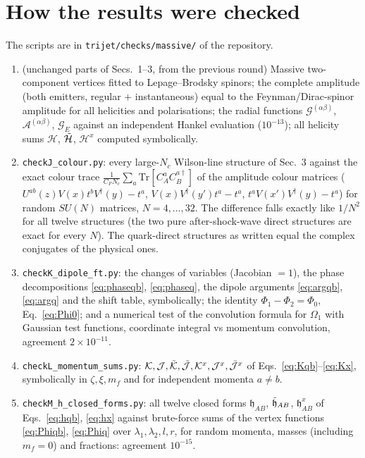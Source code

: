 \documentclass[9pt]{article}
\numberwithin{equation}{section}
\begin{document}
\section{How the results were checked}\label{app:checks}
The scripts are in \texttt{trijet/checks/massive/} of the repository.
\begin{enumerate}
    \item[E--I] (unchanged parts of Secs.~1--3, from the previous round) Massive two-component vertices fitted to Lepage--Brodsky spinors; the complete amplitude (both emitters, regular $+$ instantaneous) equal to the Feynman/Dirac-spinor amplitude for all helicities and polarisations; the radial functions $\mathcal{G}^{(\alpha\beta)}$, $\mathcal{A}^{(\alpha\beta)}$, $\mathcal{G}_{E}$ against an independent Hankel evaluation ($10^{-13}$); all helicity sums $\mathcal{H}$, $\Tilde{\mathcal{H}}$, $\mathcal{H}^{x}$ computed symbolically.
    \item[J] \texttt{checkJ\_colour.py}: every large-$N_{c}$ Wilson-line structure of Sec.~3 against the exact colour trace $\frac{1}{C_{F}N_{c}}\sum_{a}\text{Tr}[C^{a}_{A}C^{a\dagger}_{B}]$ of the amplitude colour matrices ($U^{ab}(z)V(x)t^{b}V^{\dagger}(y)-t^{a}$, $V(x)V^{\dagger}(y')t^{a}-t^{a}$, $t^{a}V(x')V^{\dagger}(y)-t^{a}$) for random $SU(N)$ matrices, $N=4,\ldots,32$. The difference falls exactly like $1/N^{2}$ for all twelve structures (the two pure after-shock-wave direct structures are exact for every $N$). The quark-direct structures as written equal the complex conjugates of the physical ones.
    \item[K] \texttt{checkK\_dipole\_ft.py}: the changes of variables (Jacobian $=1$), the phase decompositions \eqref{eq:phaseqb}, \eqref{eq:phaseq}, the dipole arguments \eqref{eq:argqb}, \eqref{eq:argq} and the shift table, symbolically; the identity $\Phi_{1}-\Phi_{2}=\Phi_{0}$, Eq.~\eqref{eq:Phi0}; and a numerical test of the convolution formula for $\Omega_{1}$ with Gaussian test functions, coordinate integral vs momentum convolution, agreement $2\times10^{-11}$.
    \item[L] \texttt{checkL\_momentum\_sums.py}: $\mathcal{K},\mathcal{J},\Tilde{\mathcal{K}},\Tilde{\mathcal{J}},\mathcal{K}^{x},\mathcal{J}^{x},\Bar{\mathcal{J}}^{x}$ of Eqs.~\eqref{eq:Kqb}--\eqref{eq:Kx}, symbolically in $\zeta,\xi,m_{f}$ and for independent momenta $a\neq b$.
    \item[M] \texttt{checkM\_h\_closed\_forms.py}: all twelve closed forms $\mathfrak{h}_{AB}$, $\Tilde{\mathfrak{h}}_{AB}$, $\mathfrak{h}^{x}_{AB}$ of Eqs.~\eqref{eq:hqb}, \eqref{eq:hx} against brute-force sums of the vertex functions \eqref{eq:Phiqb}, \eqref{eq:Phiq} over $\lambda_{1},\lambda_{2},l,r$, for random momenta, masses (including $m_{f}=0$) and fractions: agreement $10^{-15}$.
\end{enumerate}
\end{document}
